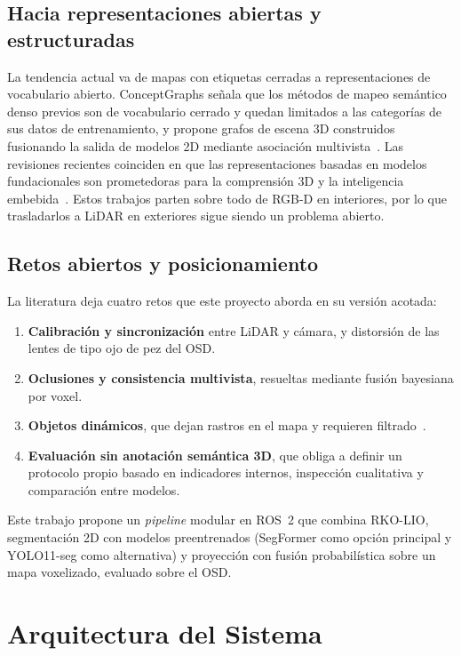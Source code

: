 \documentclass[11pt, twoside]{article}
\begin{document}
\subsection{Hacia representaciones abiertas y estructuradas}

La tendencia actual va de mapas con etiquetas cerradas a representaciones de vocabulario abierto. ConceptGraphs señala que los métodos de mapeo semántico denso previos son de vocabulario cerrado y quedan limitados a las categorías de sus datos de entrenamiento, y propone grafos de escena 3D construidos fusionando la salida de modelos 2D mediante asociación multivista~\cite{gu2024conceptgraphs}. Las revisiones recientes coinciden en que las representaciones basadas en modelos fundacionales son prometedoras para la comprensión 3D y la inteligencia embebida~\cite{firoozi2023foundation,deng2025best3d}. Estos trabajos parten sobre todo de RGB-D en interiores, por lo que trasladarlos a LiDAR en exteriores sigue siendo un problema abierto.

\subsection{Retos abiertos y posicionamiento}

La literatura deja cuatro retos que este proyecto aborda en su versión acotada:
\begin{enumerate}[noitemsep]
  \item \textbf{Calibración y sincronización} entre LiDAR y cámara, y distorsión de las lentes de tipo ojo de pez del OSD.
  \item \textbf{Oclusiones y consistencia multivista}, resueltas mediante fusión bayesiana por voxel.
  \item \textbf{Objetos dinámicos}, que dejan rastros en el mapa y requieren filtrado~\cite{jeong2018towards}.
  \item \textbf{Evaluación sin anotación semántica 3D}, que obliga a definir un protocolo propio basado en indicadores internos, inspección cualitativa y comparación entre modelos.
\end{enumerate}

Este trabajo propone un \emph{pipeline} modular en ROS~2 que combina RKO-LIO, segmentación 2D con modelos preentrenados (SegFormer como opción principal y YOLO11-seg como alternativa) y proyección con fusión probabilística sobre un mapa voxelizado, evaluado sobre el OSD.

\section{Arquitectura del Sistema}
\end{document}
